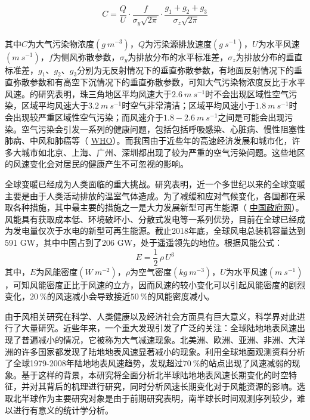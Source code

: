 \begin{equation} \label{eq:gaussian}
C = \frac{Q}{U} \cdot \frac{f}{\sigma_{y} \sqrt{2\pi}} \cdot \frac{g_{1} + g_{2} + g_{3}}{\sigma_{z} \sqrt{2\pi}}
\end{equation} ~\\
其中$C$为大气污染物浓度$(g ~ m^{-3})$，$Q$为污染源排放速度$(g ~ s^{-1})$，$U$为水平风速$(m ~ s^{-1})$，$f$为侧风弥散参数，$\sigma_{y}$为排放分布的水平标准差，$\sigma_{z}$为排放分布的垂直标准差，$g_{1}$、$g_{2}$、$g_{3}$分别为无反射情况下的垂直弥散参数，有地面反射情况下的垂直弥散参数和有高空下沉情况下的垂直弥散参数，可知大气污染物浓度反比于水平风速。\citet{张人文2011珠江三角洲风场对空气质量的影响}的研究表明，珠三角地区平均风速大于$2.6 ~ m ~ s^{-1}$时不会出现区域性空气污染，区域平均风速大于$3.2~ m ~ s^{-1}$时空气非常清洁；区域平均风速小于$1.8 ~ m ~ s^{-1}$时会出现较严重区域性空气污染；而风速介于$1.8 - 2.6 ~ m ~ s^{-1}$之间是可能会出现污染。空气污染会引发一系列的健康问题，包括包括呼吸感染、心脏病、慢性阻塞性肺病、中风和肺癌等（ \href{https://www.who.int/mediacentre/news/releases/2014/air-pollution/en/}{WHO}）。而我国由于近些年的高速经济发展和城市化，许多大城市如北京、上海、广州、深圳都出现了较为严重的空气污染问题\citep{chan2008air}。这些地区的风速变化会对居民的健康产生不可忽视的影响。

全球变暖已经成为人类面临的重大挑战。研究表明，近一个多世纪以来的全球变暖主要是由于人类活动排放的温室气体造成\citep{stocker2013climate}。为了减缓和应对气候变化，各国都在采取各种措施，其中最主要的措施之一是大力发展新型可再生能源（ \href{http://www.gov.cn/wszb/zhibo349/content_1426220.htm}{中国政府网}）。风能具有获取成本低、环境破坏小、分散式发电等一系列优势，目前在全球已经成为发电量仅次于水电的新型可再生能源\citep{carvalho2017potential}。截止2018年底，全球风电总装机容量达到591 GW，其中中国占到了206 GW，处于遥遥领先的地位\citep{ohlenforst2019global}。根据风能公式\citep{manwell2010wind}：
\begin{equation} \label{eq:windpower}
E = \frac{1}{2} \, \rho \, U^{3}
\end{equation} 
其中，$E$为风能密度$(W ~ m^{-2})$，$\rho$为空气密度$(kg ~ m^{-3})$，$U$为水平风速$(m ~ s^{-1})$，可知风能密度正比于风速的立方，因而风速的较小变化可以引起风能密度的剧烈变化，$20 ~ \%$的风速减小会导致接近$50 ~ \%$的风能密度减小。

由于风相关研究在科学、人类健康以及经济社会方面具有巨大意义，科学界对此进行了大量研究。近些年来，一个重大发现引发了广泛的关注：全球陆地地表风速出现了普遍减小的情况，它被称为大气减速现象\citep{roderick2007attribution}。北美洲、欧洲、亚洲、非洲、大洋洲的许多国家都发现了陆地地表风速显著减小的现象\citep{wan2010homogenization, pryor2010addendum, walter2006high,guo2011changes}。\citet{vautard2010northern}利用全球地面观测资料分析了全球1979-2008年陆地地表风速趋势，发现超过$70 ~\%$的站点出现了风速减弱的现象。基于这样的背景，本研究将全面分析北半球陆地地表风速长期变化的时空特征，并对其背后的机理进行研究，同时分析风速长期变化对于风能资源的影响。选取北半球作为主要研究对象是由于前期研究表明，南半球长时间观测序列较少，难以进行有意义的统计学分析。

